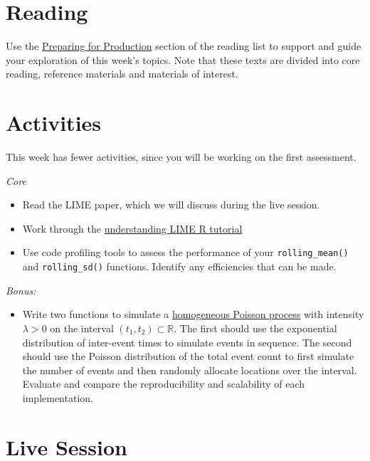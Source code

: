 \documentclass[
  12pt,
]{book}
\providecommand{\tightlist}{%
  \setlength{\itemsep}{0pt}\setlength{\parskip}{0pt}}
\begin{document}
\hypertarget{reading-3}{%
\section{Reading}\label{reading-3}}

Use the \protect\hyperlink{production-reading}{Preparing for Production} section of the reading list to support and guide your exploration of this week's topics. Note that these texts are divided into core reading, reference materials and materials of interest.

\hypertarget{activities-1}{%
\section{Activities}\label{activities-1}}

This week has fewer activities, since you will be working on the first assessment.

\emph{Core}

\begin{itemize}
\item
  Read the LIME paper, which we will discuss during the live session.
\item
  Work through the \href{https://cran.r-project.org/web/packages/lime/vignettes/Understanding_lime.html}{understanding LIME R tutorial}
\item
  Use code profiling tools to assess the performance of your \texttt{rolling\_mean()} and \texttt{rolling\_sd()} functions. Identify any efficiencies that can be made.
\end{itemize}

\emph{Bonus:}

\begin{itemize}
\tightlist
\item
  Write two functions to simulate a \href{https://en.wikipedia.org/wiki/Poisson_point_process\#Homogeneous_case_2}{homogeneous Poisson process} with intensity \(\lambda >0\) on the interval \((t_1, t_2) \subset \mathbb{R}\). The first should use the exponential distribution of inter-event times to simulate events in sequence. The second should use the Poisson distribution of the total event count to first simulate the number of events and then randomly allocate locations over the interval. Evaluate and compare the reproducibility and scalability of each implementation.
\end{itemize}

\hypertarget{live-session-3}{%
\section{Live Session}\label{live-session-3}}
\end{document}
